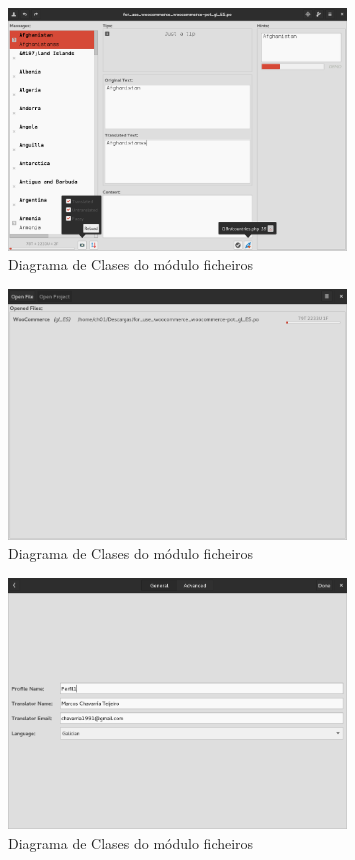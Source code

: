 \begin{figure}[h!]
    \centering
    \includegraphics[width=0.8\textwidth]{img/panel_edicion.png}
    \caption{Diagrama de Clases do módulo ficheiros}
    \label{fig:dia_class:files}
\end{figure}

\begin{figure}[h!]
    \centering
    \includegraphics[width=0.8\textwidth]{img/panel_ficheiros_abertos.png}
    \caption{Diagrama de Clases do módulo ficheiros}
    \label{fig:dia_class:files}
\end{figure}

\begin{figure}[h!]
    \centering
    \includegraphics[width=0.8\textwidth]{img/panel_pefil_xeral.png}
    \caption{Diagrama de Clases do módulo ficheiros}
    \label{fig:dia_class:files}
\end{figure}

